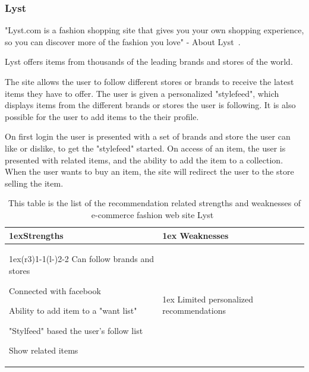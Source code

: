 \subsubsection{Lyst} %
\label{par:lyst}

"Lyst.com is a fashion shopping site that gives you your own shopping
experience, so you can discover more of the fashion you love" - About
Lyst~\cite{lyst}.

Lyst offers items from thousands of the leading brands and stores of the world.

The site allows the user to follow different stores or brands to receive the
latest items they have to offer.  The user is given a personalized "stylefeed",
which displays items from the different brands or stores the user is following.
It is also possible for the user to add items to the their profile.

On first login the user is presented with a set of brands and store the user
can like or dislike, to get the "stylefeed" started.  On access of an item, the
user is presented with related items, and the ability to add the item to a
collection.  When the user wants to buy an item, the site will redirect the
user to the store selling the item.

\begin{table}[H]
  \centering
    \begin{tabularx}{\linewidth}{>{\parskip1ex}X@{\kern4\tabcolsep}>{\parskip1ex}X}
    \toprule
      \hfil\bfseries Strengths
        &
        \hfil\bfseries Weaknesses
        \\\cmidrule(r{3\tabcolsep}){1-1}\cmidrule(l{-\tabcolsep}){2-2}
                Can follow brands and stores \par
                Connected with facebook \par
                Ability to add item to a "want list" \par
                "Stylfeed" based the user's follow list \par
                Show related items \par
                &
                Limited personalized recommendations \par
                \\\bottomrule
            \end{tabularx}
    \caption[Recommendation related strengths and weaknesses of Lyst~\cite{lyst}]{This table is the list of the recommendation related strengths and weaknesses of e-commerce fashion web site Lyst~\cite{lyst}}
    \label{table:ecommenreceLyst}
\end{table}

